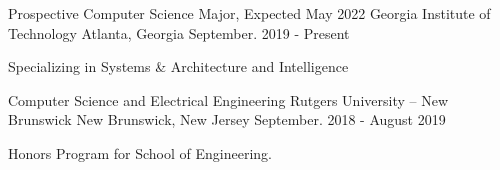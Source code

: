 \begin{cventries}

\iffalse
\cventry
    {Prospective Electrical Engineering and Computer Science Major}
    {Rutgers University}
    {New Brunswick, New Jersey}
    {September. 2018 - Present}
    {
      \begin{cvitems}
        \item {Honors Student in the Engineering Honors Academy}
      \end{cvitems}
    }
\fi
    
\cventry
    {Prospective Computer Science Major, Expected May 2022}
    {Georgia Institute of Technology}
    {Atlanta, Georgia}
    {September. 2019 - Present}
    {
      \begin{cvitems}
        \item {Specializing in Systems \& Architecture and Intelligence}
      \end{cvitems}
    }

\vspace{-3mm}

  \cventry
    {Computer Science and Electrical Engineering}
    {Rutgers University – New Brunswick}
    {New Brunswick, New Jersey}
    {September. 2018 - August 2019}
    {
      \begin{cvitems}
        \item {Honors Program for School of Engineering.}
      \end{cvitems}
    }

\vspace{-3mm}


\end{cventries}
